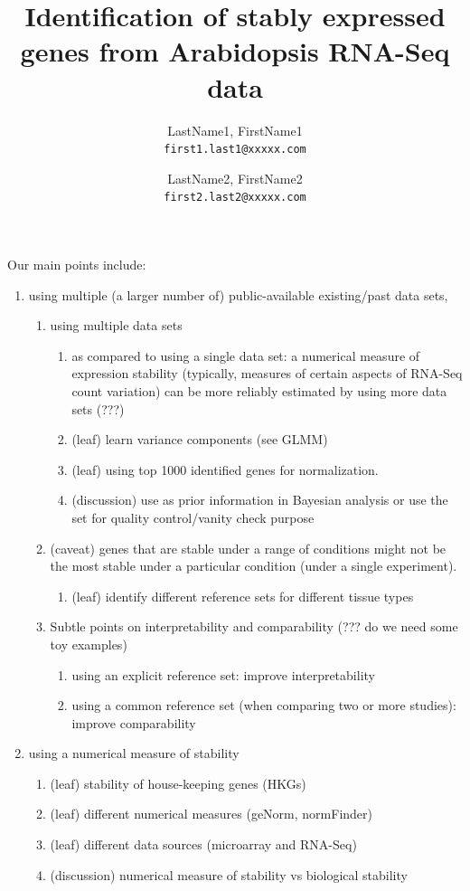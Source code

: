 \documentclass[letterpaper,12pt]{article}
\title{Identification of stably expressed genes from Arabidopsis RNA-Seq data}
\date{} %
\begin{document}
	
	
	\author{
		LastName1, FirstName1\\
		\texttt{first1.last1@xxxxx.com}
		\and
		LastName2, FirstName2\\
		\texttt{first2.last2@xxxxx.com}
	}

Our main points include: 
\begin{enumerate}
    \item using multiple (a larger number of) public-available existing/past data sets, 
	\begin{enumerate}
	    \item
		using multiple data sets 
		\begin{enumerate}
		    \item
			as compared to using a single data set: a numerical
			measure of expression stability (typically, measures
			of certain aspects of RNA-Seq count variation) can be
			more reliably estimated by using more data sets (???)
		    \item
			(leaf) learn variance components (see GLMM)
		    \item
			(leaf) using top 1000 identified genes for
			normalization.
		    \item
			(discussion) use as prior information in Bayesian analysis or
			use the  set for quality control/vanity check purpose
		\end{enumerate}
	    \item
		(caveat) genes that are stable under a range of conditions
		might not be the most stable under a particular condition
		(under a single experiment).
		\begin{enumerate}
		    \item
			(leaf) identify different reference sets for different tissue
			types
		\end{enumerate}

	    \item Subtle points on interpretability and comparability (??? do
		we need some toy examples)

		\begin{enumerate}
		    \item
			using an explicit reference set: improve interpretability
		    \item
			using a common reference set (when comparing two or more studies): improve comparability
		\end{enumerate}
	\end{enumerate}

    \item
	using a numerical measure of stability
	\begin{enumerate}
	    \item
		(leaf) stability of house-keeping genes (HKGs)
	    \item
		(leaf) different numerical measures (geNorm, normFinder)
	    \item
		(leaf) different data sources (microarray and RNA-Seq)
	    \item
		(discussion) numerical measure of stability vs biological
		stability 
	\end{enumerate}



\end{enumerate}
\end{document}
